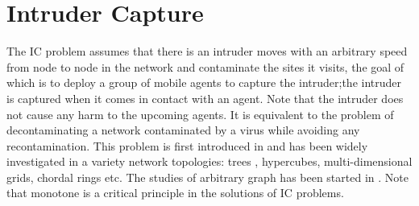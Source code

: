 \section{Intruder Capture}
The IC problem assumes that there is an intruder moves with an arbitrary speed from node to node in the network and contaminate the sites it visits, the goal of which is to deploy a group of mobile agents to capture the intruder;the intruder is captured when it comes in contact with an agent. Note that the intruder does not cause any harm to the upcoming agents. It is equivalent to the problem of decontaminating a network contaminated by a virus while avoiding any recontamination. This problem is first introduced in \cite{Flocchini} and has been widely investigated in a variety network topologies: trees \cite{Flocchini, Flocchini1,treeintruder}, hypercubes\cite{Flocchini2}, multi-dimensional grids\cite{ Flocchini2}, chordal rings\cite{Flocchini3} etc. The studies of arbitrary graph has been started in \cite{Nisse,Nisse1}. Note that monotone is a critical principle in the solutions of IC problems.  


